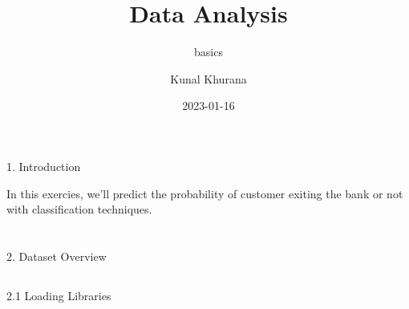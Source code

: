\documentclass[
  letterpaper,
  DIV=11,
  numbers=noendperiod]{scrartcl}
\title{Data Analysis}
\subtitle{basics}
\author{Kunal Khurana}
\date{2023-01-16}
\renewcommand*\contentsname{Table of contents}
\newcommand\contentsname{Table of contents}
\begin{document}
\maketitle
\ifdefined\Shaded\renewenvironment{Shaded}{\begin{tcolorbox}[breakable, boxrule=0pt, interior hidden, borderline west={3pt}{0pt}{shadecolor}, sharp corners, enhanced, frame hidden]}{\end{tcolorbox}}\fi

\renewcommand*\contentsname{Table of contents}
{
\hypersetup{linkcolor=}
\setcounter{tocdepth}{3}
\tableofcontents
}
\hypertarget{section}{%
\section{}\label{section}}

1. Introduction

In this exercies, we'll predict the probability of customer exiting the
bank or not with classification techniques.

\hypertarget{section-1}{%
\section{}\label{section-1}}

2. Dataset Overview

\hypertarget{section-2}{%
\subsection{}\label{section-2}}

2.1 Loading Libraries
\end{document}
